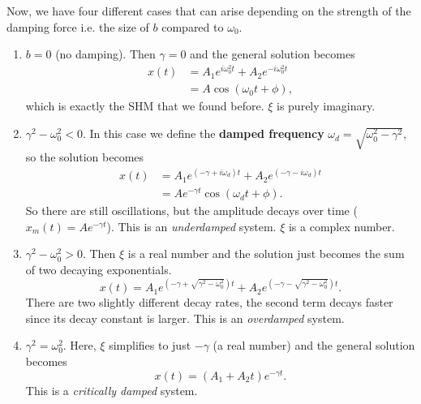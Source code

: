 \documentclass[../classical_mechanics.tex]{subfiles}
\begin{document}
        Now, we have four different cases that can arise depending on the strength of the damping force i.e. the size of $b$ compared to $\omega_0$.
        \begin{enumerate}[label=\textbf{Case \arabic*}:]
            \item $b=0$ (no damping). Then $\gamma=0$ and the general solution becomes
            \begin{align}
                x(t)&=A_1e^{i\omega_0^2t}+A_2e^{-i\omega_0^2t}\\
                &=A\cos(\omega_0 t+\phi),
            \end{align}
            which is exactly the SHM that we found before.
            $\xi$ is purely imaginary.
            \item $\gamma^2-\omega_0^2<0$. In this case we define the \textbf{damped frequency} $\omega_d=\sqrt{\omega_0^2-\gamma^2}$, so the solution becomes
            \begin{align}
                x(t)&=A_1e^{(-\gamma+i\omega_d)t}+A_2e^{(-\gamma-i\omega_d)t}\\
                &=Ae^{-\gamma t}\cos(\omega_d t+\phi).
            \end{align}
            So there are still oscillations, but the amplitude decays over time ($x_m(t)=Ae^{-\gamma t}$).
            This is an \textit{underdamped} system.
            $\xi$ is a complex number.
            \item $\gamma^2-\omega_0^2>0$. Then $\xi$ is a real number and the solution just becomes the sum of two decaying exponentials.
            \begin{equation}
                x(t)=A_1e^{(-\gamma+\sqrt{\gamma^2-\omega_0^2})t}+A_2e^{(-\gamma-\sqrt{\gamma^2-\omega_0^2})t}.
            \end{equation}
            There are two slightly different decay rates, the second term decays faster since its decay constant is larger.
            This is an \textit{overdamped} system.
            \item $\gamma^2=\omega_0^2$. Here, $\xi$ simplifies to just $-\gamma$ (a real number) and the general solution becomes
            \begin{equation}
                x(t)=(A_1+A_2t)e^{-\gamma t}.
            \end{equation}
            This is a \textit{critically damped} system.
        \end{enumerate}
\end{document}

